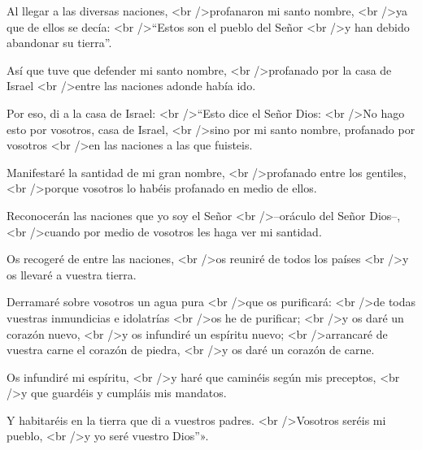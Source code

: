 			\begin{readtalk}Al llegar a las diversas naciones, <br />profanaron mi santo nombre, <br />ya que de ellos se decía: <br />“Estos son el pueblo del Señor <br />y han debido abandonar su tierra”. \end{readtalk}
			
			\begin{readtalk}Así que tuve que defender mi santo nombre, <br />profanado por la casa de Israel <br />entre las naciones adonde había ido. \end{readtalk}
			
			\begin{readtalk}Por eso, di a la casa de Israel: <br />“Esto dice el Señor Dios: <br />No hago esto por vosotros, casa de Israel, <br />sino por mi santo nombre, profanado por vosotros <br />en las naciones a las que fuisteis. \end{readtalk}
			
			\begin{readtalk}Manifestaré la santidad de mi gran nombre, <br />profanado entre los gentiles, <br />porque vosotros lo habéis profanado en medio de ellos. \end{readtalk}
			
			\begin{readtalk}Reconocerán las naciones que yo soy el Señor <br />–oráculo del Señor Dios–, <br />cuando por medio de vosotros les haga ver mi santidad. \end{readtalk}
			
			\begin{readtalk}Os recogeré de entre las naciones, <br />os reuniré de todos los países <br />y os llevaré a vuestra tierra. \end{readtalk}
			
			\begin{readtalk}Derramaré sobre vosotros un agua pura <br />que os purificará: <br />de todas vuestras inmundicias e idolatrías <br />os he de purificar; <br />y os daré un corazón nuevo, <br />y os infundiré un espíritu nuevo; <br />arrancaré de vuestra carne el corazón de piedra, <br />y os daré un corazón de carne. \end{readtalk}
			
			\begin{readtalk}Os infundiré mi espíritu, <br />y haré que caminéis según mis preceptos, <br />y que guardéis y cumpláis mis mandatos. \end{readtalk}
			
			\begin{readtalk}Y habitaréis en la tierra que di a vuestros padres. <br />Vosotros seréis mi pueblo, <br />y yo seré vuestro Dios”».\end{readtalk}
			
